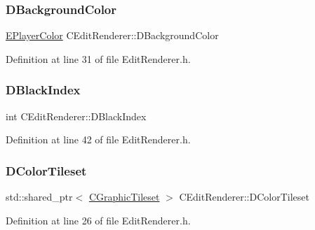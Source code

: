 \subsubsection{\texorpdfstring{D\+Background\+Color}{DBackgroundColor}}
{\footnotesize\ttfamily \hyperlink{GameDataTypes_8h_aafb0ca75933357ff28a6d7efbdd7602f}{E\+Player\+Color} C\+Edit\+Renderer\+::\+D\+Background\+Color\hspace{0.3cm}{\ttfamily [protected]}}



Definition at line 31 of file Edit\+Renderer.\+h.

\hypertarget{classCEditRenderer_a13b03f02ff6673d8df2d6509c17bcccc}{}\label{classCEditRenderer_a13b03f02ff6673d8df2d6509c17bcccc} 
\subsubsection{\texorpdfstring{D\+Black\+Index}{DBlackIndex}}
{\footnotesize\ttfamily int C\+Edit\+Renderer\+::\+D\+Black\+Index\hspace{0.3cm}{\ttfamily [protected]}}



Definition at line 42 of file Edit\+Renderer.\+h.

\hypertarget{classCEditRenderer_a43dfa83f85527019c7499e33ecaed149}{}\label{classCEditRenderer_a43dfa83f85527019c7499e33ecaed149} 
\subsubsection{\texorpdfstring{D\+Color\+Tileset}{DColorTileset}}
{\footnotesize\ttfamily std\+::shared\+\_\+ptr$<$ \hyperlink{classCGraphicTileset}{C\+Graphic\+Tileset} $>$ C\+Edit\+Renderer\+::\+D\+Color\+Tileset\hspace{0.3cm}{\ttfamily [protected]}}



Definition at line 26 of file Edit\+Renderer.\+h.

\hypertarget{classCEditRenderer_a6bbd6668cec64e318d5e814423bac3ca}{}\label{classCEditRenderer_a6bbd6668cec64e318d5e814423bac3ca} 
